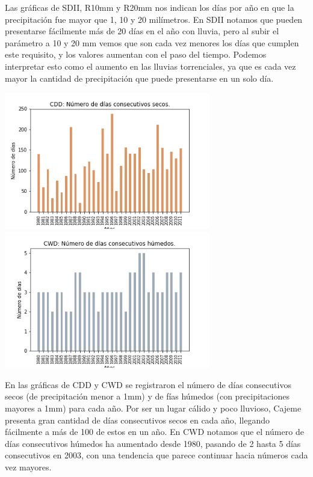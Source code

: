 \documentclass[letterpaper,12pt]{article}
\begin{document}
Las gráficas de SDII, R10mm y R20mm nos indican los días por año en que la precipitación fue mayor que 1, 10 y 20 milímetros. En SDII notamos que pueden presentarse fácilmente más de 20 días en el año con lluvia, pero al subir el parámetro a 10 y 20 mm vemos que son cada vez menores los días que cumplen este requisito, y los valores aumentan con el paso del tiempo. Podemos interpretar esto como el aumento en las lluvias torrenciales, ya que es cada vez mayor la cantidad de precipitación que puede presentarse en un solo día.

\begin{center}
   \includegraphics[height=6cm]{grafica15.png}\hspace*{\fill}
   \label{graf15}
   \includegraphics[height=6cm]{grafica16.png}
   \label{graf16}
\end{center}

En las gráficas de CDD y CWD se registraron el número de días consecutivos secos (de precipitación menor a 1mm) y de fías húmedos (con precipitaciones mayores a 1mm) para cada año. Por ser un lugar cálido y poco lluvioso, Cajeme presenta gran cantidad de días consecutivos secos en cada año, llegando fácilmente a más de 100 de estos en un año. En CWD notamos que el número de días consecutivos húmedos ha aumentado desde 1980, pasando de 2 hasta 5 días consecutivos en 2003, con una tendencia que parece continuar hacia números cada vez mayores.
\end{document}
